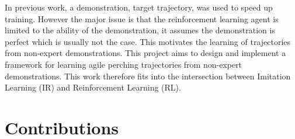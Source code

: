 In previous work, a demonstration, target trajectory, was used to speed up training.
However the major issue is that the reinforcement learning agent is limited to the ability of the demonstration, it assumes the demonstration is perfect which is usually not the case.
This motivates the learning of trajectories from non-expert demonstrations.
This project aims to design and implement a framework for learning agile perching trajectories from non-expert demonstrations.
This work therefore fits into the intersection between Imitation Learning (IR) and Reinforcement Learning (RL).

\section{Contributions}